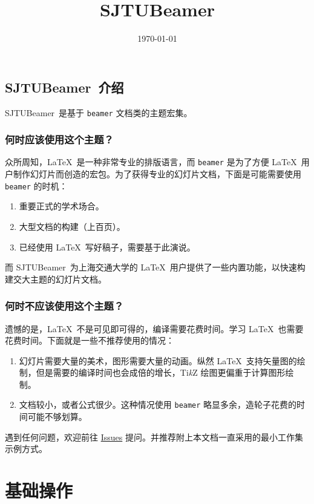 \documentclass[
    UTF8,
    heading=true,
    12pt,
    a4paper
]{ctexrep}
\def\themename{\textsf{SJTUBeamer}}
\begin{document}
\title{\themename}
\date{\today}

\chapter*{\themename\ 介绍}

\themename\ 是基于 \verb"beamer" 文档类的主题宏集。

\section*{何时应该使用这个主题？}
众所周知，\LaTeX\ 是一种非常专业的排版语言，而 \texttt{beamer} 是为了方便 \LaTeX\ 用户制作幻灯片而创造的宏包。为了获得专业的幻灯片文档，下面是可能需要使用 \texttt{beamer} 的时机：
\begin{enumerate}
  \item 重要正式的学术场合。
  \item 大型文档的构建（上百页）。
  \item 已经使用 \LaTeX\ 写好稿子，需要基于此演说。
\end{enumerate}

而 \themename\ 为上海交通大学的 \LaTeX\ 用户提供了一些内置功能，以快速构建交大主题的幻灯片文档。

\section*{何时不应该使用这个主题？}
遗憾的是，\LaTeX\ 不是可见即可得的，编译需要花费时间。学习 \LaTeX\ 也需要花费时间。下面就是一些不推荐使用的情况：
\begin{enumerate}
  \item 幻灯片需要大量的美术，图形需要大量的动画。纵然 \LaTeX\ 支持矢量图的绘制，但是需要的编译时间也会成倍的增长，Ti\emph{k}Z 绘图更偏重于计算图形绘制。
  \item 文档较小，或者公式很少。这种情况使用 \texttt{beamer} 略显多余，造轮子花费的时间可能不够划算。
\end{enumerate}

遇到任何问题，欢迎前往 \href{https://github.com/sjtug/SJTUBeamer/issues}{Issues} 提问。并推荐附上本文档一直采用的最小工作集示例方式。

\setcounter{tocdepth}{0}
\tableofcontents

\part{基础操作}
\end{document}
